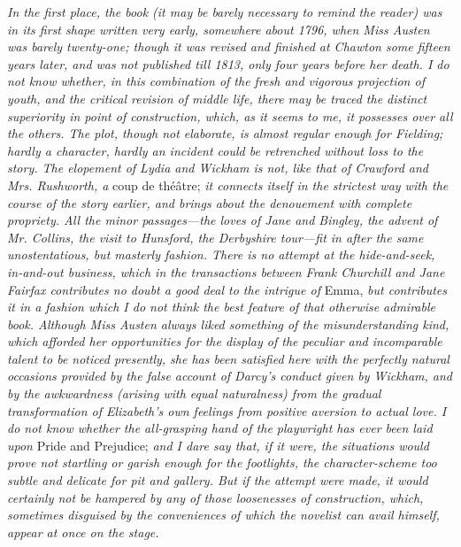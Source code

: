 \textit{In the first place, the book (it may be barely necessary to remind the reader) was in its first shape written very early, somewhere about 1796, when Miss Austen was barely twenty-one; though it was revised and finished at Chawton some fifteen years later, and was not published till 1813, only four years before her death. I do not know whether, in this combination of the fresh and vigorous projection of youth, and the critical revision of middle life, there may be traced the distinct superiority in point of construction, which, as it seems to me, it possesses over all the others. The plot, though not elaborate, is almost regular enough for Fielding; hardly a character, hardly an incident could be retrenched without loss to the story. The elopement of Lydia and Wickham is not, like that of Crawford and Mrs. Rushworth, a} coup de théâtre; \textit{it connects itself in the strictest way with the course of the story earlier, and brings about the denouement with complete propriety. All the minor passages---the loves of Jane and Bingley, the advent of Mr. Collins, the visit to Hunsford, the Derbyshire tour---fit in after the same unostentatious, but masterly fashion. There is no attempt at the hide-and-seek, in-and-out business, which in the transactions between Frank Churchill and Jane Fairfax contributes no doubt a good deal to the intrigue of} Emma, \textit{but contributes it in a fashion which I do not think the best feature of that otherwise admirable book. Although Miss Austen always liked something of the misunderstanding kind, which afforded her opportunities for the display of the peculiar and incomparable talent to be noticed presently, she has been satisfied here with the perfectly natural occasions provided by the false account of Darcy's conduct given by Wickham, and by the awkwardness (arising with equal naturalness) from the gradual transformation of Elizabeth's own feelings from positive aversion to actual love. I do not know whether the all-grasping hand of the playwright has ever been laid upon} Pride and Prejudice; \textit{and I dare say that, if it were, the situations would prove not startling or garish enough for the footlights, the character-scheme too subtle and delicate for pit and gallery. But if the attempt were made, it would certainly not be hampered by any of those loosenesses of construction, which, sometimes disguised by the conveniences of which the novelist can avail himself, appear at once on the stage.}

